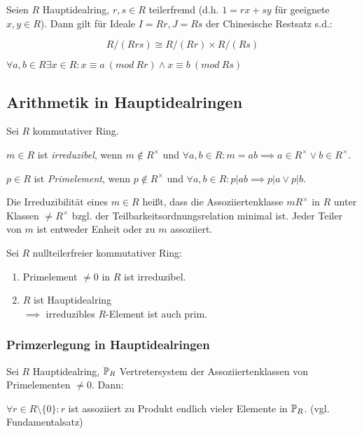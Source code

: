Seien $R$ Hauptidealring, $r, s \in R$ teilerfremd (d.h. $1=rx+sy$ für geeignete $x, y \in R$). Dann gilt für Ideale $I = Rr, J = Rs$ der Chinesische Restsatz s.d.:

\vspace*{-2mm}
\[ R/(Rrs) \cong R/(Rr) \times R/(Rs) \]

$\forall a, b \in R \exists x \in R : x \equiv a \ (mod \ Rr) \land x \equiv b \ (mod \ Rs)$

\subsection*{Arithmetik in Hauptidealringen}

Sei $R$ kommutativer Ring.

$m \in R$ ist \emph{irreduzibel}, wenn $m \notin R^\times$ und $\forall a, b \in R: m = ab \implies a \in R^\times \lor b \in R^\times$.

$p \in R$ ist \emph{Primelement}, wenn $p \notin R^\times$ und $\forall a, b \in R: p | ab \implies p | a \lor p | b$.

\spacing

Die Irreduzibilität eines $m \in R$ heißt, dass die Assoziiertenklasse $mR^\times$ in $R$ unter Klassen $\neq R^\times$ bzgl. der Teilbarkeitsordnungsrelation minimal ist. Jeder Teiler von $m$ ist entweder Enheit oder zu $m$ assoziiert.

\spacing

Sei $R$ nullteilerfreier kommutativer Ring:

\begin{enumerate}[label=(\alph*)]
	\item Primelement $\neq 0$ in $R$ ist irreduzibel.
	\item $R$ ist Hauptidealring \\ $\implies $ irreduzibles $R$-Element ist auch prim.
\end{enumerate}

\subsubsection*{Primzerlegung in Hauptidealringen}

Sei $R$ Hauptidealring, $\mathbb{P}_R$ Vertretersystem der Assoziiertenklassen von Primelementen $\neq 0$. Dann:

\vspace*{1mm}

$\forall r \in R \setminus \{0\} : r$ ist assoziiert zu Produkt endlich vieler Elemente in $\mathbb{P}_R$. (vgl. Fundamentalsatz)

